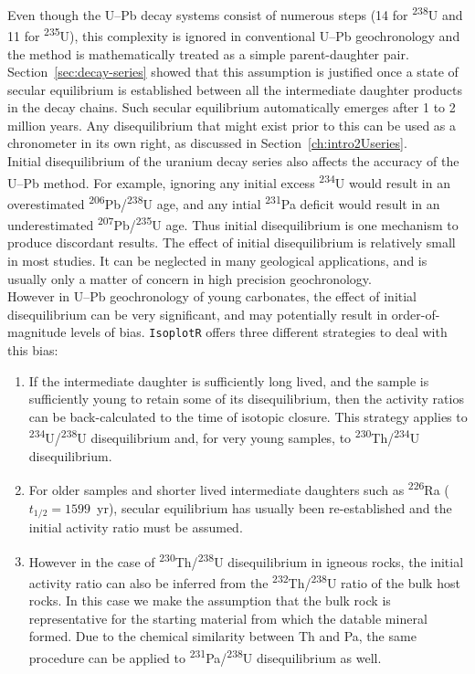 \begin{refsection}
Even though the U--Pb decay systems consist of numerous steps (14 for
\textsuperscript{238}U and 11 for \textsuperscript{235}U), this
complexity is ignored in conventional U--Pb geochronology and the
method is mathematically treated as a simple parent-daughter pair.
Section~\ref{sec:decay-series} showed that this assumption is
justified once a state of secular equilibrium is established between
all the intermediate daughter products in the decay chains.  Such
secular equilibrium automatically emerges after 1 to 2 million years.
Any disequilibrium that might exist prior to this can be used as a
chronometer in its own right, as discussed in
Section~\ref{ch:intro2Useries}.\\

Initial disequilibrium of the uranium decay series also affects the
accuracy of the U--Pb method. For example, ignoring any initial excess
\textsuperscript{234}U would result in an overestimated
\textsuperscript{206}Pb/\textsuperscript{238}U age, and any intial
\textsuperscript{231}Pa deficit would result in an underestimated
\textsuperscript{207}Pb/\textsuperscript{235}U age. Thus initial
disequilibrium is one mechanism to produce discordant results. The
effect of initial disequilibrium is relatively small in most
studies. It can be neglected in many geological applications, and is
usually only a matter of concern in high precision geochronology.\\

However in U--Pb geochronology of young carbonates, the effect of
initial disequilibrium can be very significant, and may potentially
result in order-of-magnitude levels of bias. \texttt{IsoplotR} offers
three different strategies to deal with this bias:

\begin{enumerate}
\item If the intermediate daughter is sufficiently long lived, and the
  sample is sufficiently young to retain some of its disequilibrium,
  then the activity ratios can be back-calculated to the time of
  isotopic closure.  This strategy applies to
  \textsuperscript{234}U/\textsuperscript{238}U disequilibrium and,
  for very young samples, to
  \textsuperscript{230}Th/\textsuperscript{234}U disequilibrium.
\item For older samples and shorter lived intermediate daughters such
  as \textsuperscript{226}Ra ($t_{1/2}=1599$~yr), secular equilibrium
  has usually been re-established and the initial activity ratio must
  be assumed.
\item However in the case of
  \textsuperscript{230}Th/\textsuperscript{238}U disequilibrium in
  igneous rocks, the initial activity ratio can also be inferred from
  the \textsuperscript{232}Th/\textsuperscript{238}U ratio of the bulk
  host rocks. In this case we make the assumption that the bulk rock
  is representative for the starting material from which the datable
  mineral formed. Due to the chemical similarity between Th and Pa,
  the same procedure can be applied to
  \textsuperscript{231}Pa/\textsuperscript{238}U disequilibrium as
  well.
\end{enumerate}


\end{refsection}
